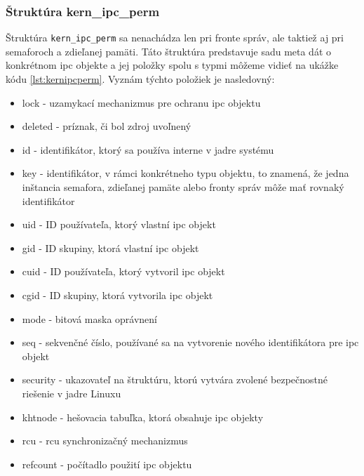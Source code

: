 \subsubsection{Štruktúra kern\_ipc\_perm} \label{kernipcperm}
Štruktúra \texttt{kern\_ipc\_perm} sa nenachádza len pri fronte správ, ale taktiež aj pri semaforoch a zdieľanej pamäti. Táto štruktúra predstavuje sadu meta dát o konkrétnom \acrshort{ipc} objekte a jej položky spolu s typmi môžeme vidieť na ukážke kódu \ref{lst:kernipcperm}. Vyznám týchto položiek je nasledovný:
\begin{itemize}
\item lock - uzamykací mechanizmus pre ochranu \acrshort{ipc} objektu
\item deleted - príznak, či bol zdroj uvoľnený
\item id -  identifikátor, ktorý sa používa interne v jadre systému
\item key - identifikátor, v rámci konkrétneho typu objektu, to znamená, že jedna inštancia semafora, zdieľanej pamäte alebo fronty správ môže mať rovnaký identifikátor
\item uid - ID používateľa, ktorý vlastní \acrshort{ipc} objekt
\item gid - ID skupiny, ktorá vlastní \acrshort{ipc} objekt
\item cuid - ID používateľa, ktorý vytvoril \acrshort{ipc} objekt
\item cgid - ID skupiny, ktorá vytvorila \acrshort{ipc} objekt
\item mode - bitová maska oprávnení
\item seq - sekvenčné číslo, používané sa na vytvorenie nového identifikátora pre \acrshort{ipc} objekt
\item security - ukazovateľ na štruktúru, ktorú vytvára zvolené bezpečnostné riešenie v jadre Linuxu
\item khtnode - hešovacia tabuľka, ktorá obsahuje \acrshort{ipc} objekty
\item rcu - \acrshort{rcu} synchronizačný mechanizmus
\item refcount - počítadlo použití \acrshort{ipc} objektu
\end{itemize}
